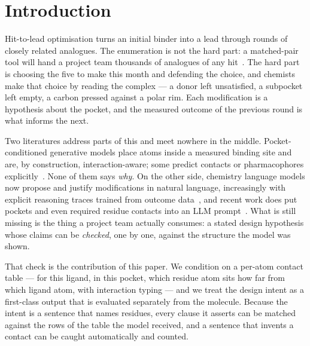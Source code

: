 \section{Introduction}

Hit-to-lead optimisation turns an initial binder into a lead through rounds of closely related
analogues. The enumeration is not the hard part: a matched-pair tool will hand a project team
thousands of analogues of any hit~\citep{wawer2014whatnext}. The hard part is choosing the five to
make this month and defending the choice, and chemists make that choice by reading the complex ---
a donor left unsatisfied, a subpocket left empty, a carbon pressed against a polar rim. Each
modification is a hypothesis about the pocket, and the measured outcome of the previous round is
what informs the next.

Two literatures address parts of this and meet nowhere in the middle. Pocket-conditioned generative
models place atoms inside a measured binding site and are, by construction, interaction-aware;
some predict contacts or pharmacophores explicitly~\citep{peng2022pocket2mol,guan2023targetdiff,
schneuing2024diffsbdd,feng2024lingo3dmol,jiang2024pocketflow}. None of them says \emph{why}. On the
other side, chemistry language models now propose and justify modifications in natural language,
increasingly with explicit reasoning traces trained from outcome
data~\citep{zhao2024chemdfm,narayanan2025ether0,cavanagh2024smileyllama,liu2026desro,liu2026drugr,
wen2026logos}, and recent work does put pockets and even required residue contacts into an LLM
prompt~\citep{macdougall2026spatial}. What is still missing is the thing a project team actually
consumes: a stated design hypothesis whose claims can be \emph{checked}, one by one, against the
structure the model was shown.

That check is the contribution of this paper. We condition on a per-atom contact table --- for this
ligand, in this pocket, which residue atom sits how far from which ligand atom, with interaction
typing --- and we treat the design intent as a first-class output that is evaluated separately from
the molecule. Because the intent is a sentence that names residues, every clause it asserts can be
matched against the rows of the table the model received, and a sentence that invents a contact can
be caught automatically and counted.

